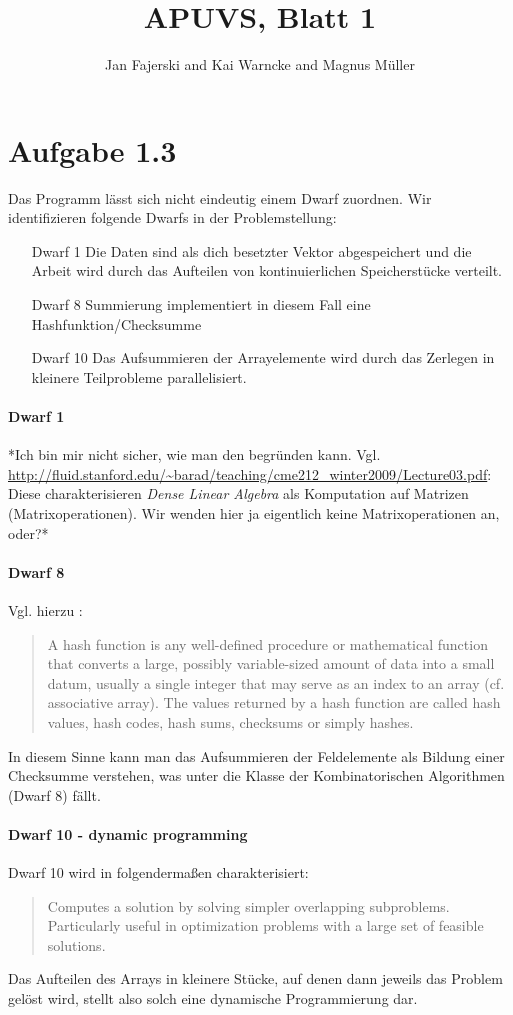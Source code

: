 \documentclass[a4paper,
               12pt,
               BCOR12mm,
               ]{scrartcl}
\title{APUVS, Blatt 1}
\author{Jan Fajerski and Kai Warncke and Magnus Müller}
\begin{document}
\maketitle  
  \section*{Aufgabe 1.3}
		Das Programm lässt sich nicht eindeutig einem Dwarf zuordnen. Wir identifizieren folgende
		Dwarfs in der Problemstellung:
    \begin{itemize}
      \item [Dwarf 1] Die Daten sind als dich besetzter Vektor abgespeichert und die Arbeit wird durch das Aufteilen von kontinuierlichen Speicherstücke verteilt.
      \item [Dwarf 8] Summierung implementiert in diesem Fall eine Hashfunktion/Checksumme
      \item [Dwarf 10] Das Aufsummieren der Arrayelemente wird durch das Zerlegen in kleinere Teilprobleme parallelisiert.
    \end{itemize}
		\paragraph{Dwarf 1}
		*Ich bin mir nicht sicher, wie man den begründen kann. Vgl.
		\url{http://fluid.stanford.edu/~barad/teaching/cme212_winter2009/Lecture03.pdf}: Diese
		charakterisieren \emph{Dense Linear Algebra} als Komputation auf Matrizen
		(Matrixoperationen). Wir wenden hier ja eigentlich keine Matrixoperationen an, oder?*
		
		\paragraph{Dwarf 8}
		Vgl. hierzu \cite{wiki_hash}:
		\begin{quotation}
			A hash function is any well-defined procedure or mathematical function that converts
			a large, possibly variable-sized amount of data into a small datum, usually a single
			integer that may serve as an index to an array (cf. associative array). The values
			returned by a hash function are called hash values, hash codes, hash sums, checksums
			or simply hashes.
		\end{quotation}
		In diesem Sinne kann man das Aufsummieren der Feldelemente als Bildung einer
		Checksumme verstehen, was unter die Klasse der Kombinatorischen Algorithmen (Dwarf 8)
		fällt.

		\paragraph{Dwarf 10 - dynamic programming}
		Dwarf 10 wird in \cite[S. 16]{eecs} folgendermaßen charakterisiert:
		\begin{quotation}
			Computes a solution by solving simpler overlapping subproblems.
			Particularly useful in optimization problems with a large set of feasible
			solutions.
		\end{quotation}
		Das Aufteilen des Arrays in kleinere Stücke, auf denen dann jeweils das Problem gelöst
		wird, stellt also solch eine dynamische Programmierung dar.
\end{document}
